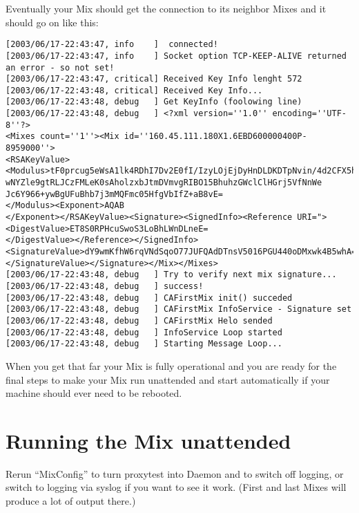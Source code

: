 \documentclass{article}
\begin{document}
Eventually your Mix should get the connection to its neighbor Mixes and it should go on like this:

\begin{verbatim}
[2003/06/17-22:43:47, info    ]  connected!
[2003/06/17-22:43:47, info    ] Socket option TCP-KEEP-ALIVE returned an error - so not set!
[2003/06/17-22:43:47, critical] Received Key Info lenght 572
[2003/06/17-22:43:48, critical] Received Key Info...
[2003/06/17-22:43:48, debug   ] Get KeyInfo (foolowing line)
[2003/06/17-22:43:48, debug   ] <?xml version=''1.0'' encoding=''UTF-8''?>
<Mixes count=''1''><Mix id=''160.45.111.180X1.6EBD600000400P-8959000''>
<RSAKeyValue><Modulus>tF0prcug5eWsA1lk4RDhI7Dv2E0fI/IzyLOjEjDyHnDLDKDTpNvin/4d2CFX5h33
wNYZle9gtRLJCzFMLeK0sAholzxbJtmDVmvgRIBO15BhuhzGWclClHGrj5VfNnWe
Jc6Y966+ywBgUFuBhb7j3mMQFmc05HfgVbIfZ+aB8vE=
</Modulus><Exponent>AQAB
</Exponent></RSAKeyValue><Signature><SignedInfo><Reference URI="><DigestValue>ET8S0RPHcuSwoS3LoBhLWnDLneE=
</DigestValue></Reference></SignedInfo><SignatureValue>dY9wmKfhW6rqVNdSqoO77JUFQAdDTnsV5016PGU440oDMxwk4B5whA==
</SignatureValue></Signature></Mix></Mixes>
[2003/06/17-22:43:48, debug   ] Try to verify next mix signature...[2003/06/17-22:43:48, debug   ] success!
[2003/06/17-22:43:48, debug   ] CAFirstMix init() succeded
[2003/06/17-22:43:48, debug   ] CAFirstMix InfoService - Signature set
[2003/06/17-22:43:48, debug   ] CAFirstMix Helo sended
[2003/06/17-22:43:48, debug   ] InfoService Loop started
[2003/06/17-22:43:48, debug   ] Starting Message Loop...
\end{verbatim}

When you get that far your Mix is fully operational and you are
ready for the final steps to make your Mix run unattended and start
automatically if your machine should ever need to be rebooted.



\section {Running the Mix unattended}

Rerun ``MixConfig'' to turn proxytest into Daemon and to switch off
logging, or switch to logging via syslog if you want to see it work.
(First and last Mixes will produce a lot of output there.)

\end{document}
